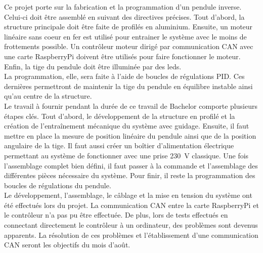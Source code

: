Ce projet porte sur la fabrication et la programmation d'un pendule inverse. Celui-ci doit être assemblé en suivant des directives précises.
Tout d'abord, la structure principale doit être faite de profilés en aluminium. Ensuite, un moteur linéaire sans coeur en fer est utilisé pour
entrainer le système avec le moins de frottements possible. Un contrôleur moteur dirigé par communication \gls{CAN} avec une carte RaspberryPi doivent être
utilisés pour faire fonctionner le moteur. Enfin, la tige du pendule doit être illuminée par des leds.\\

La programmation, elle, sera faite à l'aide de boucles de régulations \gls{PID}. Ces dernières permettront de maintenir la tige du pendule
en équilibre instable ainsi qu'au centre de la structure.\\

Le travail à fournir pendant la durée de ce travail de Bachelor comporte plusieurs étapes clés. Tout d'abord, le développement de la structure
en profilé et la création de l'entraînement mécanique du système avec guidage. Ensuite, il faut mettre en place la mesure de position linéaire
du pendule ainsi que de la position angulaire de la tige. Il faut aussi créer un boîtier d'alimentation électrique permettant au système de
fonctionner avec une prise 230~V classique. Une fois l'assemblage complet bien défini, il faut passer à la commande et l'assemblage des
différentes pièces nécessaire du système. Pour finir, il reste la programmation des boucles de régulations du pendule.\\

Le développement, l'assemblage, le câblage et la mise en tension du système ont été effectués lors du projet. La communication CAN entre la carte
RaspberryPi et le contrôleur n'a pas pu être effectuée. De plus, lors de tests effectués en connectant directement le contrôleur à un ordinateur,
des problèmes sont devenus apparents. La résolution de ces problèmes et l'établissement d'une communication \gls{CAN} seront les objectifs du mois
d'août.
